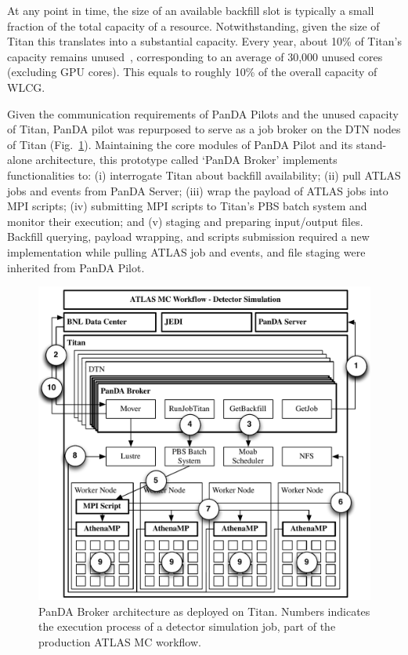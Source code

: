 \documentclass[conference]{IEEEtran}
\begin{document}
At any point in time, the size of an available backfill slot is typically a
small fraction of the total capacity of a resource. Notwithstanding, given the
size of Titan this translates into a substantial capacity. Every year, about
10\% of Titan's capacity remains unused~\cite{barker2016us}, corresponding to an
average of 30,000 unused cores (excluding GPU cores). This equals to roughly
10\% of the overall capacity of WLCG.

Given the communication requirements of PanDA Pilots and the unused capacity of
Titan, PanDA pilot was repurposed to serve as a job broker on the DTN nodes of
Titan (Fig.~\ref{fig:panda_broker}). Maintaining the core modules of PanDA Pilot
and its stand-alone architecture, this prototype called `PanDA Broker'
implements functionalities to: (i) interrogate Titan about backfill
availability; (ii) pull ATLAS jobs and events from PanDA Server; (iii) wrap the
payload of ATLAS jobs into MPI scripts; (iv) submitting MPI scripts to Titan's
PBS batch system and monitor their execution; and (v) staging and preparing
input/output files. Backfill querying, payload wrapping, and scripts submission
required a new implementation while pulling ATLAS job and events, and file
staging were inherited from PanDA Pilot.

\begin{figure}
    \centering
    \includegraphics[width=\columnwidth]{panda_broker_architecture.pdf}
    \caption{PanDA Broker architecture as deployed on Titan. Numbers indicates
    the execution process of a detector simulation job, part of the production
    ATLAS MC workflow.}
\label{fig:panda_broker}
\end{figure}
\end{document}
